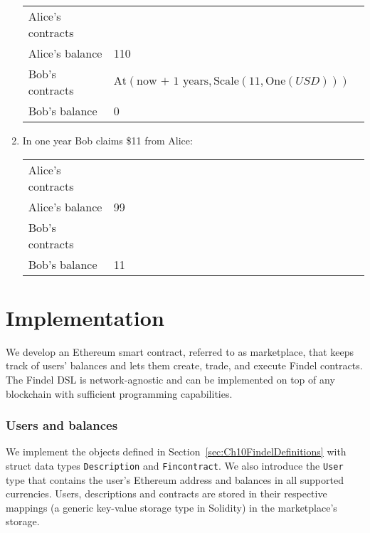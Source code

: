 \begin{enumerate}
	\begin{tabular}{| p{0.25\linewidth} | p{0.75\linewidth} |}
		\hline
		Alice's contracts & \\
		Alice's balance & 110 \\
		Bob's contracts & \(\mathrm{At}(\text{now + 1 years},\mathrm{Scale}(11,\mathrm{One}(USD)))\) \\
		Bob's balance & 0 \\
		\hline    
	\end{tabular}
	
	\item In one year Bob claims \$11 from Alice:
	
	\begin{tabular}{| p{0.25\linewidth} | p{0.75\linewidth} |}
		\hline
		Alice's contracts & \\
		Alice's balance & 99\\
		Bob's contracts & \\
		Bob's balance & 11\\
		\hline    
	\end{tabular}
	
\end{enumerate}




\section{Implementation} \label{sec:Ch10FindelImplementation}

We develop an Ethereum smart contract, referred to as marketplace, that keeps track of users' balances and lets them create, trade, and execute Findel contracts.
The Findel DSL is network-agnostic and can be implemented on top of any blockchain with sufficient programming capabilities.


\subsubsection{Users and balances}

We implement the objects defined in Section~\ref{sec:Ch10FindelDefinitions} with struct data types \texttt{Description} and \texttt{Fincontract}.
We also introduce the \texttt{User} type that contains the user's Ethereum address and balances in all supported currencies.
Users, descriptions and contracts are stored in their respective mappings (a generic key-value storage type in Solidity) in the marketplace's storage.


